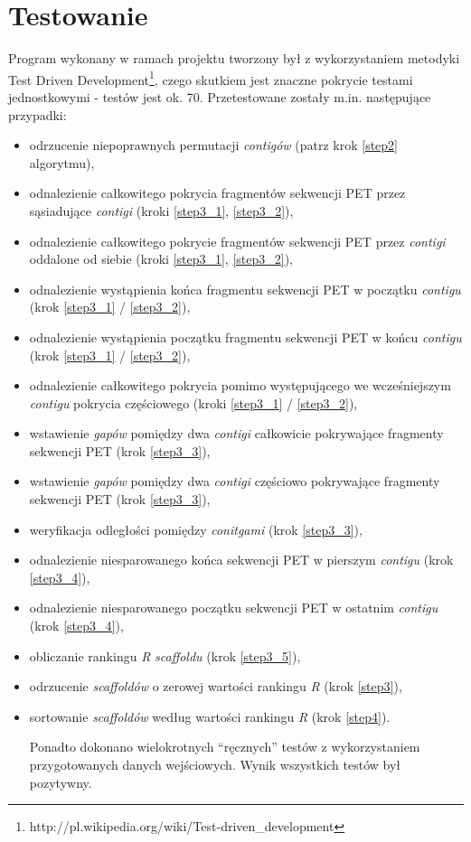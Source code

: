 \documentclass[a4paper,10pt]{article}
\begin{document}
\section*{Testowanie}
Program wykonany w ramach projektu tworzony był z wykorzystaniem metodyki Test Driven Development\footnote{http://pl.wikipedia.org/wiki/Test-driven\_development}, czego skutkiem jest znaczne pokrycie testami jednostkowymi - testów jest ok. 70. Przetestowane zostały m.in. następujące przypadki:
\begin{itemize}
 \item odrzucenie niepoprawnych permutacji \emph{contigów} (patrz krok \ref{step2} algorytmu),
 \item odnalezienie całkowitego pokrycia fragmentów sekwencji PET przez sąsiadujące \emph{contigi} (kroki \ref{step3_1}, \ref{step3_2}),
 \item odnalezienie całkowitego pokrycie fragmentów sekwencji PET przez \emph{contigi} oddalone od siebie (kroki \ref{step3_1}, \ref{step3_2}),
 \item odnalezienie wystąpienia końca fragmentu sekwencji PET w początku \emph{contigu} (krok \ref{step3_1} / \ref{step3_2}),
 \item odnalezienie wystąpienia początku fragmentu sekwencji PET w końcu \emph{contigu} (krok \ref{step3_1} / \ref{step3_2}),
 \item odnalezienie całkowitego pokrycia pomimo występującego we wcześniejszym \emph{contigu} pokrycia częściowego (kroki \ref{step3_1} / \ref{step3_2}),
 \item wstawienie \emph{gapów} pomiędzy dwa \emph{contigi} całkowicie pokrywające fragmenty sekwencji PET (krok \ref{step3_3}),
 \item wstawienie \emph{gapów} pomiędzy dwa \emph{contigi} częściowo pokrywające fragmenty sekwencji PET (krok \ref{step3_3}),
 \item weryfikacja odległości pomiędzy \emph{conitgami} (krok \ref{step3_3}),
 \item odnalezienie niesparowanego końca sekwencji PET w pierszym \emph{contigu} (krok \ref{step3_4}),
 \item odnalezienie niesparowanego początku sekwencji PET w ostatnim \emph{contigu} (krok \ref{step3_4}),
 \item obliczanie rankingu \emph{R} \emph{scaffoldu} (krok \ref{step3_5}),
 \item odrzucenie \emph{scaffoldów} o zerowej wartości rankingu \emph{R} (krok \ref{step3}),
 \item sortowanie \emph{scaffoldów} według wartości rankingu \emph{R} (krok \ref{step4}).
 
Ponadto dokonano wielokrotnych ``ręcznych'' testów z wykorzystaniem przygotowanych danych wejściowych. Wynik wszystkich testów był pozytywny.
 
\end{itemize}
\end{document}
